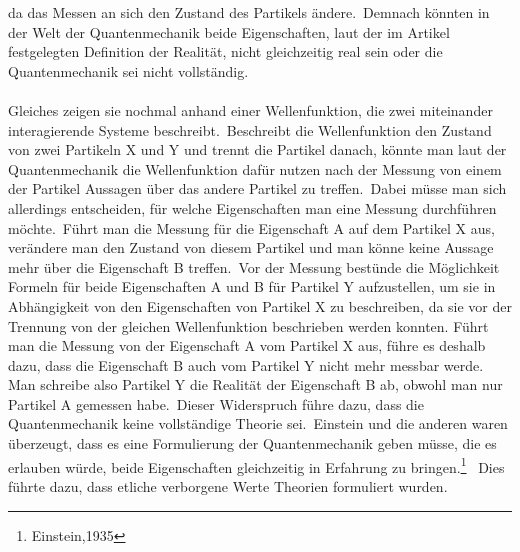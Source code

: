 da das Messen an sich den Zustand des Partikels ändere.\ Demnach könnten in der Welt der Quantenmechanik beide Eigenschaften, laut der im Artikel festgelegten Definition der Realität, nicht gleichzeitig real sein oder die Quantenmechanik sei nicht vollständig.\\\\
Gleiches zeigen sie nochmal anhand einer Wellenfunktion, die zwei miteinander interagierende Systeme beschreibt.\ Beschreibt die Wellenfunktion den Zustand von zwei Partikeln X und Y und trennt die Partikel danach, könnte man laut der Quantenmechanik die Wellenfunktion dafür nutzen nach der Messung von einem der Partikel Aussagen über das andere Partikel zu treffen.\ Dabei müsse man sich allerdings entscheiden, für welche Eigenschaften man eine Messung durchführen möchte.\ Führt man die Messung für die Eigenschaft A auf dem Partikel X aus, verändere man den Zustand von diesem Partikel und man könne keine Aussage mehr über die Eigenschaft B treffen.\ Vor der Messung bestünde die Möglichkeit Formeln für beide Eigenschaften A und B für Partikel Y aufzustellen, um sie in Abhängigkeit von den Eigenschaften von Partikel X zu beschreiben, da sie vor der Trennung von der gleichen Wellenfunktion beschrieben werden konnten. Führt man die Messung von der Eigenschaft A vom Partikel X aus, führe es deshalb dazu, dass die Eigenschaft B auch vom Partikel Y nicht mehr messbar werde. Man schreibe also Partikel Y die Realität der Eigenschaft B ab, obwohl man nur Partikel A gemessen habe.\ Dieser Widerspruch führe dazu, dass die Quantenmechanik keine vollständige Theorie sei.\ Einstein und die anderen waren überzeugt, dass es eine Formulierung der Quantenmechanik geben müsse, die es erlauben würde, beide Eigenschaften gleichzeitig in Erfahrung zu bringen.\footnote{Einstein,1935}
\ Dies führte dazu, dass etliche verborgene Werte Theorien formuliert wurden. \\

